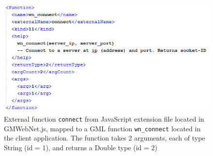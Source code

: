 \documentclass[bsc, 12pt, twoside, singlespacing, parskip, abbrevs, notimes, normalheadings, logo]{styles/infthesis}
\begin{document}
\begin{figure}
\centering
\includegraphics[scale=1.2]{images/xml_mapping.png}
\caption{External function \texttt{connect} from JavaScript extension file located in GMWebNet.js, mapped to a GML function \texttt{wn\_connect} located in the client application. The function takes 2 arguments, each of type String (id = 1), and returns a Double type (id = 2)}
\label{fig:xml_mapping}
\vspace{1em}
\end{figure}





\end{document}
